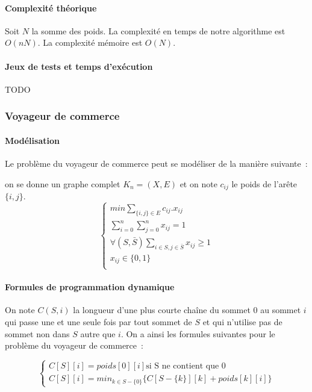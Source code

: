 \documentclass[a4paper, 12pt]{article}
\begin{document}
\paragraph{Complexité théorique}

Soit $N$ la somme des poids.
La complexité en temps de notre algorithme est $O(nN)$.
La complexité mémoire est $O(N).$

\paragraph{Jeux de tests et temps d'exécution}

TODO

\subsubsection{Voyageur de commerce}

\paragraph{Modélisation}

Le problème du voyageur de commerce peut se modéliser de la manière
suivante~:


on se donne un graphe complet $K_n=(X,E)$ et on note $c_{ij}$ le poids
de l'arête $\{i,j\}$.
\begin{equation}
\begin{cases}
min \sum_{\{i, j\} \in E} c_{ij}.x_{ij} \\
\sum_{i=0}^n \sum_{j=0}^n x_{ij} = 1 \\
\forall (S, \bar{S}) \sum_{i \in S, j \in \bar{S}} x_{ij} \geq 1 \\
x_{ij} \in \{0, 1\} \\
\end{cases}
\end{equation}

\paragraph{Formules de programmation dynamique}

On note $C(S,i)$ la longueur d'une plus courte chaîne du sommet $0$ au
sommet $i$ qui passe une et une seule fois par tout sommet de $S$ et
qui n'utilise pas de sommet non dans $S$ autre que $i$. On a ainsi les
formules suivantes pour le problème du voyageur de commerce~:

\begin{equation}
\begin{cases}
C[S][i] = poids[0][i] \text{si S ne contient que $0$} \\
C[S][i] = min_{k \in S - \{ 0 \}} \{ C[S- \{ k \}][k] + poids[k][i]  \}
\end{cases}
\end{equation}
\end{document}
